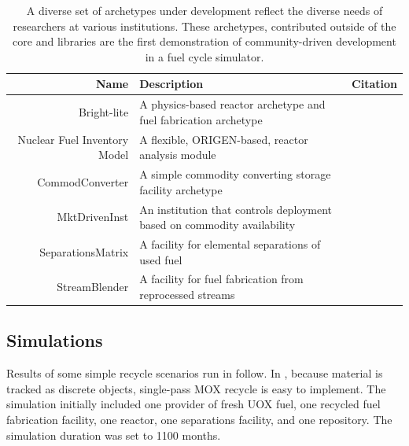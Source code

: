 \begin{table}[h]
\centering
\begin{tabularx}{\textwidth}{|r|X|r|}
\hline
\textbf{Name} & \textbf{Description} & \textbf{Citation} \\
\hline
Bright-lite & A physics-based reactor archetype and fuel fabrication archetype & \cite{flanagan_bright-lite_2014} \\
Nuclear Fuel Inventory Model & A flexible, ORIGEN-based, reactor analysis module & \cite{skutnik_nuclear_2014} \\
CommodConverter & A simple commodity converting storage facility archetype  & \cite{huff_commodconverter_2014} \\
MktDrivenInst & An institution that controls deployment based on commodity availability & \cite{huff_mktdriveninst_2014} \\
SeparationsMatrix & A facility for elemental separations of used fuel & \cite{huff_streamblender_2014} \\
StreamBlender & A facility for fuel fabrication from reprocessed streams & \cite{huff_streamblender_2014} \\
\hline
\end{tabularx}
\caption{A diverse set of archetypes under development reflect the diverse 
needs of researchers at various institutions. These archetypes, contributed 
outside of the \Cyclus core and \Cycamore libraries are the first demonstration 
of community-driven development in a fuel cycle simulator.}
\label{tab:archetypes}
\end{table}


\subsection{Simulations}


Results of some simple recycle scenarios run in \Cyclus follow.  In \Cyclus,
because material is tracked as discrete objects, single-pass \gls{MOX} 
recycle is
easy to implement.  The simulation initially included one provider of fresh
\gls{UOX} fuel, one recycled fuel fabrication facility, one reactor, one separations
facility, and one repository. The simulation duration was set to 1100 months.

